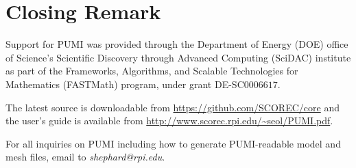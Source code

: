 \section{Closing Remark}

Support for PUMI was provided through the Department of Energy (DOE) office of Science's Scientific
Discovery through Advanced Computing (SciDAC) institute as part of the Frameworks, Algorithms, and Scalable Technologies for Mathematics (FASTMath) program, under grant DE-SC$0006617$.

The latest source is downloadable from \url{https://github.com/SCOREC/core} and the user's guide is available from \url{http://www.scorec.rpi.edu/~seol/PUMI.pdf}. 

For all inquiries on PUMI including how to generate PUMI-readable model and mesh files, email to \emph{shephard@rpi.edu}.
